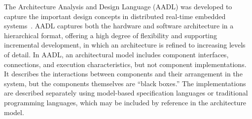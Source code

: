
The Architecture Analysis and Design Language (AADL) was developed to capture the important design concepts in distributed real-time embedded systems~\cite{FeilerModelBasedEngineering2012}. 
AADL captures both the hardware and software architecture in a hierarchical format,  
offering a high degree of flexibility and supporting incremental development, in which an architecture is refined to increasing levels of detail.
%
In AADL, an architectural model includes component interfaces, connections, and execution characteristics, but not component implementations. It describes the interactions between components and their arrangement in the system, but the components themselves are ``black boxes.'' The implementations are described separately using model-based specification languages or traditional programming languages, which may be included by reference in the architecture model.  

